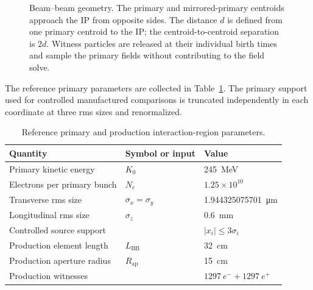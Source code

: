 \documentclass[11pt,a4paper]{article}
\begin{document}
\begin{figure}[htbp]
  \caption{Beam--beam geometry.  The primary and mirrored-primary centroids
  approach the IP from opposite sides.  The distance $d$ is defined from one
  primary centroid to the IP; the centroid-to-centroid separation is $2d$.
  Witness particles are released at their individual birth times and sample
  the primary fields without contributing to the field solve.}
  \label{fig:geometry}
\end{figure}

The reference primary parameters are collected in
Table~\ref{tab:primary-parameters}.  The primary support used for controlled
manufactured comparisons is truncated independently in each coordinate at
three rms sizes and renormalized.

\begin{table}[htbp]
  \centering
  \caption{Reference primary and production interaction-region parameters.}
  \label{tab:primary-parameters}
  \begin{tabular}{@{}lll@{}}
    \toprule
    Quantity & Symbol or input & Value \\
    \midrule
    Primary kinetic energy & $K_0$ & \SI{245}{\mega\electronvolt} \\
    Electrons per primary bunch & $N_e$ & $1.25\times10^{10}$ \\
    Transverse rms size & $\sigma_x=\sigma_y$ & \SI{1.944325075701}{\micro\metre} \\
    Longitudinal rms size & $\sigma_z$ & \SI{0.6}{\milli\metre} \\
    Controlled source support & & $|x_i|\leq3\sigma_i$ \\
    Production element length & $L_{\mathrm{BB}}$ & \SI{32}{\centi\metre} \\
    Production aperture radius & $R_{\mathrm{ap}}$ & \SI{15}{\centi\metre} \\
    Production witnesses & & $1297~e^-+1297~e^+$ \\
    \bottomrule
  \end{tabular}
\end{table}
\end{document}
